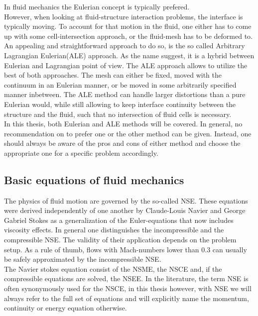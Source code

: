 \documentclass[../main.tex]{subfiles}
\begin{document}
In fluid mechanics the Eulerian concept is typically prefered.\\
However, when looking at fluid-structure interaction problems, the interface is typically moving. To account for that motion in the fluid, one either has to come up with some cell-intersection approach, or the fluid-mesh has to be deformed to.\\
An appealing and straightforward approach to do so, is the so called Arbitrary Lagrangian Eulerian(\ac{ALE}) approach. As the name suggest, it is a hybrid between Eulerian and Lagrangian point of view. The \ac{ALE} approach allows to utilize the best of both approaches. The mesh can either be fixed, moved with the continuum in an Eulerian manner, or be moved in some arbitrarily specified manner inbetween. The \ac{ALE} method can handle larger distortions than a pure Eulerian would, while still allowing to keep interface continuity between the structure and the fluid, such that no intersection of fluid cells is necessary.\\
In this thesis, both Eulerian and \ac{ALE} methods will be covered. In general, no recommendation on to prefer one or the other method can be given. Instead, one should always be aware of the pros and cons of either method and choose the appropriate one for a specific problem accordingly.


\subsection{Basic equations of fluid mechanics}\label{sec:fluid_equations_basic}

The physics of fluid motion are governed by the so-called \acf{NSE}. These equations were derived independently of one another by Claude-Louis Navier and George Gabriel Stokes as a generalization of the Euler-equations that now includes viscosity effects.
In general one distinguishes the incompressible and the compressible \ac{NSE}. The validity of their application depends on the problem setup. As a rule of thumb, flows with Mach-numbers lower than $0.3$ can usually be safely approximated by the incompressible \ac{NSE}.\\
The Navier stokes equation consist of the \acf{NSME}, the \ac{NSCE} and, if the compressible equations are solved, the \ac{NSEE}. In the literature, the term \ac{NSE} is often synonymously used for the \ac{NSCE}, in this thesis however, with \ac{NSE} we will always refer to the full set of equations and will explicitly name the momentum, continuity or energy equation otherwise.
\end{document}
